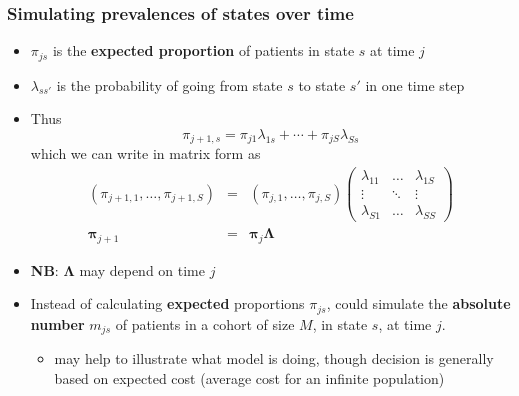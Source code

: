 \begin{frame}

\frametitle{Simulating prevalences of states over time}

\begin{itemize}
\item $\pi_{js}$ is the \textbf{expected proportion} of patients in state $s$ at time $j$
\item $\lambda_{ss'}$ is the probability of going from state $s$ to state $s'$ in one time step
\item Thus \myblue 
$$\pi_{j+1,s}=\pi_{j1}\lambda_{1s}+\cdots+\pi_{jS}\lambda_{Ss}$$
\black 
which we can write in matrix form as \myblue
\[
\begin{array}{rcl}
(\pi_{j+1,1},\ldots,\pi_{j+1,S})&=&(\pi_{j,1},\ldots,\pi_{j,S})
\left(
\begin{array}{ccc}
\lambda_{11} & \ldots & \lambda_{1S} \\
\vdots & \ddots & \vdots \\
\lambda_{S1} & \ldots & \lambda_{SS} 
\end{array}
\right) \nonumber \\
\bm{\pi}_{j+1}&=&\bm{\pi}_j \bm\Lambda
\end{array}
\]
\black 
\item \textbf{NB}: $\bm\Lambda$ may depend on time $j$

\pause

\item Instead of calculating \textbf{expected} proportions $\pi_{js}$, could
  simulate the \textbf{absolute number} $m_{js}$ of patients in a
  cohort of size $M$, in state $s$, at time $j$.
  \begin{itemize}
  \item may help to illustrate what model is doing, though decision is generally based on \alert{expected} cost (average cost for an infinite population)
  \end{itemize}
  
\end{itemize}





\end{frame}


